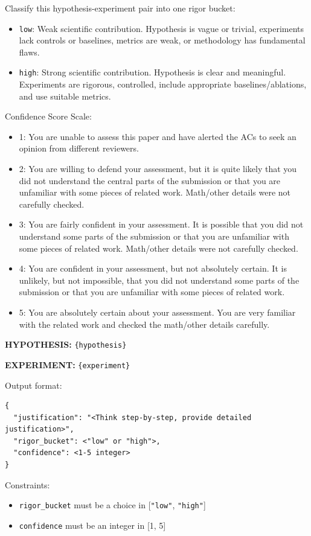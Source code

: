 \begin{tcolorbox}[title=\textbf{User Prompt for Standard Evaluation}]
\small

Classify this hypothesis-experiment pair into one rigor bucket:
\begin{itemize}[leftmargin=*,itemsep=0pt,topsep=0pt]
    \item \texttt{low}: Weak scientific contribution. Hypothesis is vague or trivial, experiments lack controls or baselines, metrics are weak, or methodology has fundamental flaws.
    \item \texttt{high}: Strong scientific contribution. Hypothesis is clear and meaningful. Experiments are rigorous, controlled, include appropriate baselines/ablations, and use suitable metrics.
\end{itemize}

Confidence Score Scale:
\begin{itemize}[leftmargin=*,itemsep=0pt,topsep=0pt]
    \item 1: You are unable to assess this paper and have alerted the ACs to seek an opinion from different reviewers.
    \item 2: You are willing to defend your assessment, but it is quite likely that you did not understand the central parts of the submission or that you are unfamiliar with some pieces of related work. Math/other details were not carefully checked.
    \item 3: You are fairly confident in your assessment. It is possible that you did not understand some parts of the submission or that you are unfamiliar with some pieces of related work. Math/other details were not carefully checked.
    \item 4: You are confident in your assessment, but not absolutely certain. It is unlikely, but not impossible, that you did not understand some parts of the submission or that you are unfamiliar with some pieces of related work.
    \item 5: You are absolutely certain about your assessment. You are very familiar with the related work and checked the math/other details carefully.
\end{itemize}

\textbf{HYPOTHESIS:} \texttt{\{hypothesis\}}

\textbf{EXPERIMENT:} \texttt{\{experiment\}}

Output format:
\begin{verbatim}
{
  "justification": "<Think step-by-step, provide detailed justification>",
  "rigor_bucket": <"low" or "high">,
  "confidence": <1-5 integer>
}
\end{verbatim}

Constraints:
\begin{itemize}[leftmargin=*,itemsep=0pt,topsep=0pt]
    \item \texttt{rigor\_bucket} must be a choice in [\texttt{"low"}, \texttt{"high"}]
    \item \texttt{confidence} must be an integer in [1, 5]
\end{itemize}
\end{tcolorbox}


